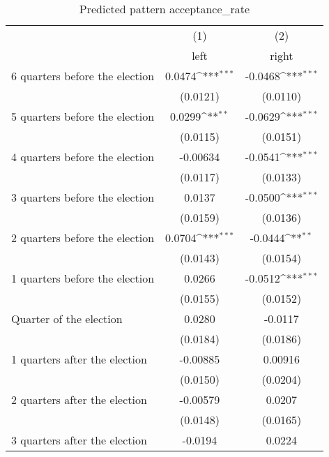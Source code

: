 \begin{table}[htbp]\centering
\def\sym#1{\ifmmode^{#1}\else\(^{#1}\)\fi}
\caption{Predicted pattern acceptance\_rate}
\begin{tabular}{l*{2}{c}}
\hline\hline
                    &\multicolumn{1}{c}{(1)}&\multicolumn{1}{c}{(2)}\\
                    &\multicolumn{1}{c}{left}&\multicolumn{1}{c}{right}\\
\hline
 6 quarters before the election&      0.0474\sym{***}&     -0.0468\sym{***}\\
                    &    (0.0121)         &    (0.0110)         \\
[1em]
 5 quarters before the election&      0.0299\sym{**} &     -0.0629\sym{***}\\
                    &    (0.0115)         &    (0.0151)         \\
[1em]
 4 quarters before the election&    -0.00634         &     -0.0541\sym{***}\\
                    &    (0.0117)         &    (0.0133)         \\
[1em]
 3 quarters before the election&      0.0137         &     -0.0500\sym{***}\\
                    &    (0.0159)         &    (0.0136)         \\
[1em]
 2 quarters before the election&      0.0704\sym{***}&     -0.0444\sym{**} \\
                    &    (0.0143)         &    (0.0154)         \\
[1em]
 1 quarters before the election&      0.0266         &     -0.0512\sym{***}\\
                    &    (0.0155)         &    (0.0152)         \\
[1em]
Quarter of the election&      0.0280         &     -0.0117         \\
                    &    (0.0184)         &    (0.0186)         \\
[1em]
 1 quarters after the election&    -0.00885         &     0.00916         \\
                    &    (0.0150)         &    (0.0204)         \\
[1em]
 2 quarters after the election&    -0.00579         &      0.0207         \\
                    &    (0.0148)         &    (0.0165)         \\
[1em]
 3 quarters after the election&     -0.0194         &      0.0224         \\

\end{tabular}
\end{table}
